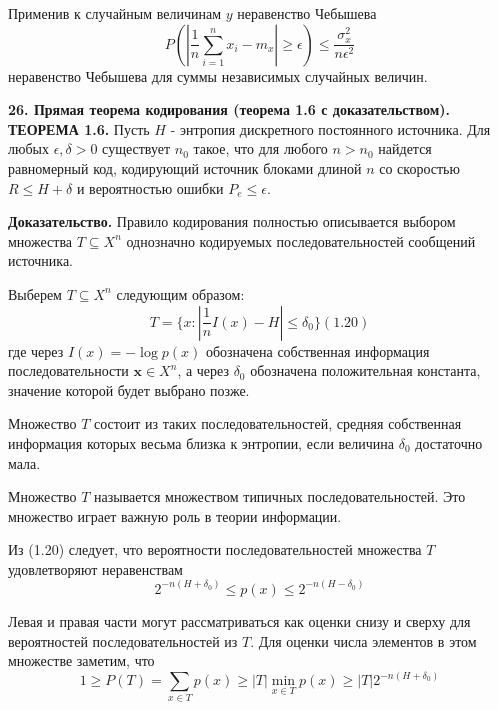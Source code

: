 \documentclass[14pt]{article}
\begin{document}
Применив к случайным величинам \(y\) неравенство Чебышева \\
\begin{displaymath}
    P(|\frac{1}{n}\sum_{i=1}^{n} x_i - m_x| \geq \epsilon) \leq \frac{\sigma_x^2}{n\epsilon^2}
\end{displaymath}
неравенство Чебышева для суммы независимых случайных величин.

\bigskip
\textbf{26. Прямая теорема кодирования (теорема 1.6 с доказательством).} \\

\textbf{ТЕОРЕМА 1.6.} Пусть \(H\) - энтропия дискретного постоянного источника. Для любых \(\epsilon,\delta > 0\) существует \(n_0\) такое, что для любого \(n > n_0\) найдется равномерный код, кодирующий источник блоками длиной \(n\) со скоростью \( R \leq H + \delta\) и вероятностью ошибки \(P_e \leq \epsilon\).

\textbf{Доказательство.} Правило кодирования полностью описывается выбором множества \(T \subseteq X^n\) однозначно кодируемых последовательностей сообщений источника.

Выберем \(T \subseteq X^n\) следующим образом:
\begin{displaymath}
    T = \Big\{x: |\frac{1}{n}I(x) - H| \leq \delta_0\Big\}   (1.20)
\end{displaymath}
где через \(I(x) = -\log p(x)\) обозначена собственная информация последовательности \(\textbf{x} \in X^n\), а через \(\delta_0\) обозначена положительная константа, значение которой будет выбрано позже.

Множество \(T\) состоит из таких последовательностей, средняя собственная информация которых весьма близка к энтропии, если величина \(\delta_0\) достаточно мала.

Множество \(T\) называется множеством типичных последовательностей. Это множество играет важную роль в теории информации.

Из (1.20) следует, что вероятности последовательностей множества \(T\) удовлетворяют неравенствам
\begin{displaymath}
    2^{-n(H+\delta_0)} \leq p(x) \leq 2^{-n(H-\delta_0)}
\end{displaymath}

Левая и правая части могут рассматриваться как оценки снизу и сверху для вероятностей последовательностей из \(T\). Для оценки числа элементов в этом множестве заметим, что
\begin{displaymath}
    1 \geq P(T) = \sum_{x \in T} p(x) \geq |T| \min_{x \in T} p(x) \geq |T| 2^{-n(H+\delta_0)}
\end{displaymath}
\end{document}

